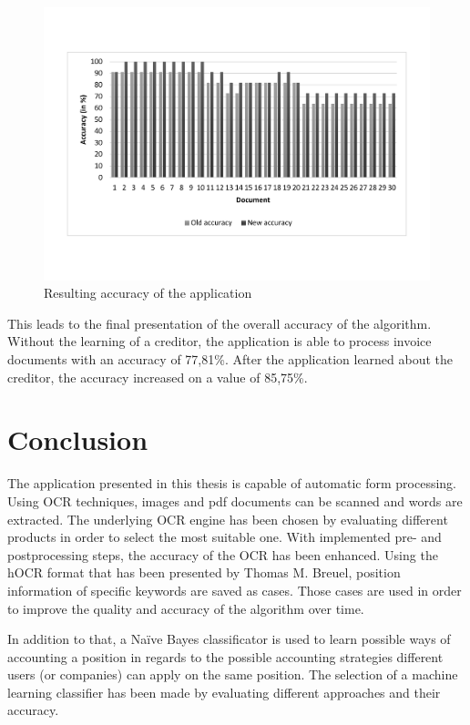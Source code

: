 \begin{figure}[ht!]
\centering
\includegraphics[width=\textwidth]{Images/Accuracy/Values2.pdf}
\caption{Resulting accuracy of the application \label{accuracyTable2}}
\end{figure}

This leads to the final presentation of the overall accuracy of the algorithm. Without the learning of a creditor, the application is able to process invoice documents with an accuracy of 77,81\%. After the application learned about the creditor, the accuracy increased on a value of 85,75\%.

\section{Conclusion}
\label{sec6.2}

The application presented in this thesis is capable of automatic form processing. Using OCR techniques, images and pdf documents can be scanned and words are extracted. The underlying OCR engine has been chosen by evaluating different products in order to select the most suitable one.
With implemented pre- and postprocessing steps, the accuracy of the OCR has been enhanced. Using the hOCR format that has been presented by Thomas M. Breuel\cite{Breuel07}, position information of specific keywords are saved as cases. Those cases are used in order to improve the quality and accuracy of the algorithm over time. 

In addition to that, a Na{\"i}ve Bayes classificator is used to learn possible ways of accounting a position in regards to the possible accounting strategies different users (or companies) can apply on the same position. The selection of a machine learning classifier has been made by evaluating different approaches and their accuracy. 


